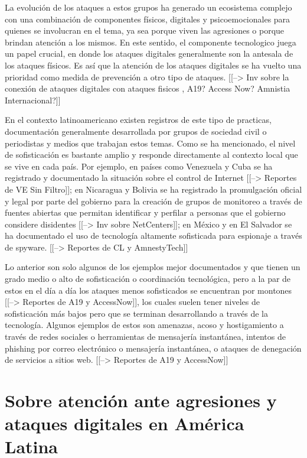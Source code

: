 \documentclass[12pt]{caltech_thesis}
\begin{document}
La evolución de los ataques a estos grupos ha generado un ecosistema complejo con una combinación de componentes físicos, digitales y psicoemocionales para quienes se involucran en el tema, ya sea porque viven las agresiones o porque brindan atención a los mismos. En este sentido, el componente tecnologico juega un papel crucial, en donde los ataques digitales generalmente son la antesala de los ataques físicos. Es así que la atención de los ataques digitales se ha vuelto una prioridad como medida de prevención a otro tipo de ataques. [[--> Inv sobre la conexión de ataques digitales con ataques fisicos , A19? Access Now? Amnistia Internacional?]]

En el contexto latinoamericano existen registros de este tipo de practicas, documentación generalmente desarrollada por grupos de sociedad civil o periodistas y medios que trabajan estos temas. Como se ha mencionado, el nivel de sofisticación es bastante amplio y responde directamente al contexto local que se vive en cada país. Por ejemplo, en países como Venezuela y Cuba se ha registrado y documentado la situación sobre el control de Internet [[--> Reportes de VE Sin Filtro]]; en Nicaragua y Bolivia se ha registrado la promulgación oficial y legal por parte del gobierno para la creación de grupos de monitoreo a través de fuentes abiertas que permitan identificar y perfilar a personas que el gobierno considere disidentes [[--> Inv sobre NetCenters]]; en México y en El Salvador se ha documentado el uso de tecnología altamente sofisticada para espionaje a través de spyware. [[--> Reportes de CL y AmnestyTech]]

Lo anterior son solo algunos de los ejemplos mejor documentados y que tienen un grado medio o alto de sofisticación o coordinación tecnológica, pero a la par de estos en el día a día los ataques menos sofisticados se encuentran por montones [[--> Reportes de A19 y AccessNow]], los cuales suelen tener niveles de sofisticación más bajos pero que se terminan desarrollando a través de la tecnología. Algunos ejemplos de estos son amenazas, acoso y hostigamiento a través de redes sociales o herramientas de mensajería instantánea, intentos de phishing por correo electrónico o mensajería instantánea, o ataques de denegación de servicios a sitios web. [[--> Reportes de A19 y AccessNow]]

\section{Sobre atención ante agresiones y ataques digitales en América Latina}
\end{document}

